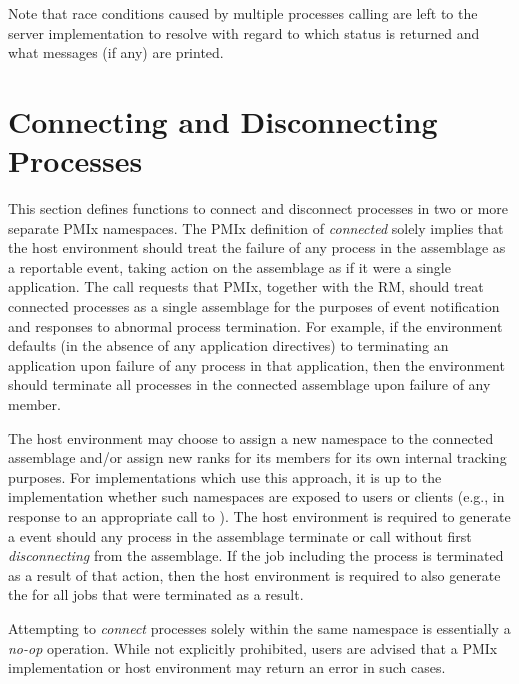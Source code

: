 Note that race conditions caused by multiple processes calling  are left to the server implementation to resolve with regard to which status is returned and what messages (if any) are printed.
\adviceuserend


\section{Connecting and Disconnecting Processes}
\label{chap:api_proc_mgmt:connect}

This section defines functions to connect and disconnect processes in two or more separate \ac{PMIx} namespaces. 
The \ac{PMIx} definition of \textit{connected} solely implies that the host environment should treat the failure of any process in the assemblage as a reportable event, taking action on the assemblage as if it were a single application. 
The call requests that \ac{PMIx}, together with the \ac{RM}, should treat connected processes as a single assemblage for the purposes of event notification and responses to abnormal process termination.
For example, if the environment defaults (in the absence of any application directives) to terminating an application upon failure of any process in that application, then the environment should terminate all processes in the connected assemblage upon failure of any member.

The host environment may choose to assign a new namespace to the connected assemblage and/or assign new ranks for its members for its own internal tracking purposes.  For implementations which use this approach, it is up to the implementation whether such namespaces are exposed to users or clients (e.g., in response to an appropriate call to ). The host environment is required to generate a  event should any process in the assemblage terminate or call  without first \textit{disconnecting} from the assemblage. If the job including the process is terminated as a result of that action, then the host environment is required to also generate the  for all jobs that were terminated as a result.

\adviceuserstart
Attempting to \textit{connect} processes solely within the same namespace is essentially a \textit{no-op} operation. While not explicitly prohibited, users are advised that a \ac{PMIx} implementation or host environment may return an error in such cases.
\adviceuserend

